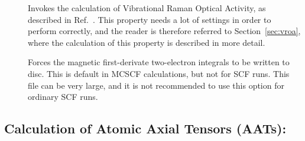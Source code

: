 \begin{description}
\item[] Invokes the calculation of Vibrational Raman
Optical Activity, as
described in Ref.~\cite{thkrklbpjjofd99}. This
property needs a lot of settings in order to perform correctly, and
the reader is therefore referred to Section~\ref{sec:vroa}, where the
calculation of this property is described in more detail.

\item[] Forces the magnetic first-derivate two-electron
integrals to be written to disc. This is default in MCSCF
calculations, but not for SCF runs. This file can be very large, and
it is not recommended to use this option for ordinary SCF runs.

\end{description}

\subsection{Calculation of Atomic Axial Tensors (AATs):
}\label{sec:aat}

